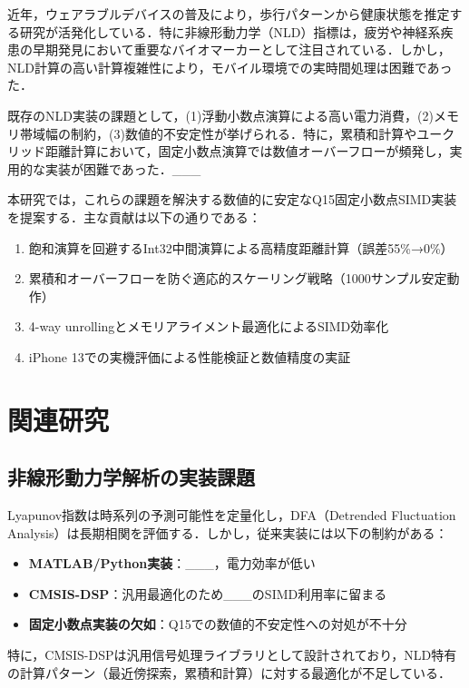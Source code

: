 \documentclass[paper]{ieice}
\begin{document}
近年，ウェアラブルデバイスの普及により，歩行パターンから健康状態を推定する研究が活発化している\cite{hausdorff2009}．特に非線形動力学（NLD）指標は，疲労や神経系疾患の早期発見において重要なバイオマーカーとして注目されている\cite{peng1995}．しかし，NLD計算の高い計算複雑性により，モバイル環境での実時間処理は困難であった．

既存のNLD実装の課題として，(1)浮動小数点演算による高い電力消費，(2)メモリ帯域幅の制約，(3)数値的不安定性が挙げられる．特に，累積和計算やユークリッド距離計算において，固定小数点演算では数値オーバーフローが頻発し，実用的な実装が困難であった．___

本研究では，これらの課題を解決する数値的に安定なQ15固定小数点SIMD実装を提案する．主な貢献は以下の通りである：

\begin{enumerate}
\item 飽和演算を回避するInt32中間演算による高精度距離計算（誤差55\%→0\%）
\item 累積和オーバーフローを防ぐ適応的スケーリング戦略（1000サンプル安定動作）
\item 4-way unrollingとメモリアライメント最適化によるSIMD効率化
\item iPhone 13での実機評価による性能検証と数値精度の実証
\end{enumerate}

\section{関連研究}

\subsection{非線形動力学解析の実装課題}

Lyapunov指数\cite{rosenstein1993}は時系列の予測可能性を定量化し，DFA（Detrended Fluctuation Analysis）\cite{peng1994}は長期相関を評価する．しかし，従来実装には以下の制約がある：

\begin{itemize}
\item \textbf{MATLAB/Python実装}：___，電力効率が低い
\item \textbf{CMSIS-DSP}\cite{arm2020}：汎用最適化のため___のSIMD利用率に留まる
\item \textbf{固定小数点実装の欠如}：Q15での数値的不安定性への対処が不十分
\end{itemize}

特に，CMSIS-DSPは汎用信号処理ライブラリとして設計されており，NLD特有の計算パターン（最近傍探索，累積和計算）に対する最適化が不足している．
\end{document}
